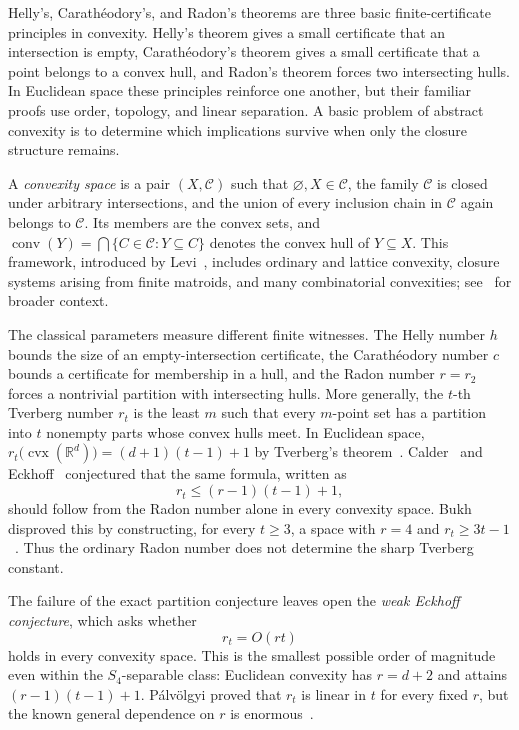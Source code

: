 \documentclass[11pt]{article}
\theoremstyle{definition}
\newcommand{\C}{\mathcal{C}}
\newcommand{\conv}{\operatorname{conv}}
\newcommand{\cvx}{\operatorname{cvx}}
\renewcommand{\Re}{\mathbb{R}}
\begin{document}
Helly's, Carath\'eodory's, and Radon's theorems are three basic finite-certificate principles in convexity. Helly's theorem gives a small certificate that an intersection is empty, Carath\'eodory's theorem gives a small certificate that a point belongs to a convex hull, and Radon's theorem forces two intersecting hulls. In Euclidean space these principles reinforce one another, but their familiar proofs use order, topology, and linear separation. A basic problem of abstract convexity is to determine which implications survive when only the closure structure remains.

A \emph{convexity space} is a pair $(X,\C)$ such that $\varnothing,X\in\C$, the family $\C$ is closed under arbitrary intersections, and the union of every inclusion chain in $\C$ again belongs to $\C$. Its members are the convex sets, and
$\conv(Y)=\bigcap\{C\in\C:Y\subseteq C\}$
denotes the convex hull of $Y\subseteq X$. This framework, introduced by Levi~\cite{levi1951helly}, includes ordinary and lattice convexity, closure systems arising from finite matroids, and many combinatorial convexities; see~\cite{barany2022helly,holmsen2024helly} for broader context.

The classical parameters measure different finite witnesses. The Helly number $h$ bounds the size of an empty-intersection certificate, the Carath\'eodory number $c$ bounds a certificate for membership in a hull, and the Radon number $r=r_2$ forces a nontrivial partition with intersecting hulls. More generally, the $t$-th Tverberg number $r_t$ is the least $m$ such that every $m$-point set has a partition into $t$ nonempty parts whose convex hulls meet. In Euclidean space,
$r_t\bigl(\cvx(\Re^d)\bigr)=(d+1)(t-1)+1$
by Tverberg's theorem~\cite{tverberg1966generalization}. Calder~\cite{calder1971some} and Eckhoff~\cite{eckhoff1979radon} conjectured that the same formula, written as
\[
r_t\le (r-1)(t-1)+1,
\]
should follow from the Radon number alone in every convexity space. Bukh disproved this by constructing, for every $t\ge3$, a space with $r=4$ and $r_t\ge3t-1$~\cite{bukh2010radon}. Thus the ordinary Radon number does not determine the sharp Tverberg constant.

The failure of the exact partition conjecture leaves open the \emph{weak Eckhoff conjecture}, which asks whether
\[
r_t=O(rt)
\]
holds in every convexity space. This is the smallest possible order of magnitude even within the $S_4$-separable class: Euclidean convexity has $r=d+2$ and attains $(r-1)(t-1)+1$. P\'alv\"olgyi proved that $r_t$ is linear in $t$ for every fixed $r$, but the known general dependence on $r$ is enormous~\cite{palvolgyi2022radon}.
\end{document}
